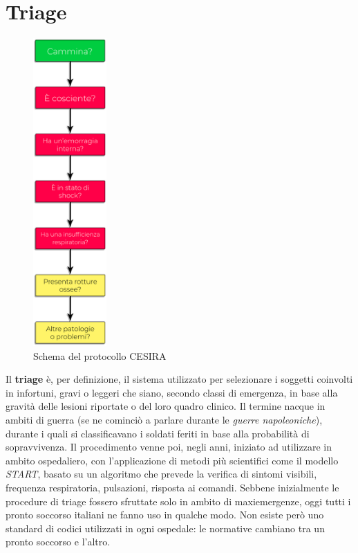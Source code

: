 \section{Triage}
\begin{figure}
    \begin{center}
        \includegraphics[width=0.25\textwidth]{images/Schema-CESIRA-ombra.png}
    \end{center}
    \caption{Schema del protocollo CESIRA}
\end{figure}
Il \textbf{triage} è, per definizione, il sistema utilizzato per selezionare i soggetti coinvolti in infortuni, gravi o leggeri che siano, secondo classi di emergenza, in base alla gravità delle lesioni riportate o del loro quadro clinico. Il termine nacque in ambiti di guerra (se ne cominciò a parlare durante le \textit{guerre napoleoniche}), durante i quali si classificavano i soldati feriti in base alla probabilità di sopravvivenza. Il procedimento venne poi, negli anni, iniziato ad utilizzare in ambito ospedaliero, con l'applicazione di metodi più scientifici come il modello \textit{START}, basato su un algoritmo che prevede la verifica di sintomi visibili, frequenza respiratoria, pulsazioni, risposta ai comandi. Sebbene inizialmente le procedure di triage fossero sfruttate solo in ambito di maxiemergenze, oggi tutti i pronto soccorso italiani ne fanno uso in qualche modo. Non esiste però uno standard di codici utilizzati in ogni ospedale: le normative cambiano tra un pronto soccorso e l'altro.
